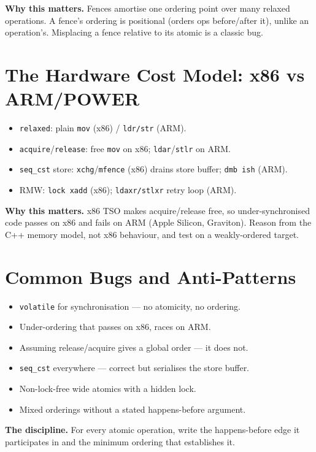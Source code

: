 \textbf{Why this matters.} Fences amortise one ordering point over many relaxed operations. A fence's ordering is positional (orders ops before/after it), unlike an operation's. Misplacing a fence relative to its atomic is a classic bug.

\section{The Hardware Cost Model: x86 vs ARM/POWER}
\begin{itemize}
\item \texttt{relaxed}: plain \texttt{mov} (x86) / \texttt{ldr/str} (ARM).
\item \texttt{acquire}/\texttt{release}: free \texttt{mov} on x86; \texttt{ldar}/\texttt{stlr} on ARM.
\item \texttt{seq\_cst} store: \texttt{xchg}/\texttt{mfence} (x86) drains store buffer; \texttt{dmb ish} (ARM).
\item RMW: \texttt{lock xadd} (x86); \texttt{ldaxr/stlxr} retry loop (ARM).
\end{itemize}

\textbf{Why this matters.} x86 TSO makes acquire/release free, so under-synchronised code passes on x86 and fails on ARM (Apple Silicon, Graviton). Reason from the C++ memory model, not x86 behaviour, and test on a weakly-ordered target.

\section{Common Bugs and Anti-Patterns}
\begin{itemize}
\item \texttt{volatile} for synchronisation --- no atomicity, no ordering.
\item Under-ordering that passes on x86, races on ARM.
\item Assuming release/acquire gives a global order --- it does not.
\item \texttt{seq\_cst} everywhere --- correct but serialises the store buffer.
\item Non-lock-free wide atomics with a hidden lock.
\item Mixed orderings without a stated happens-before argument.
\end{itemize}

\textbf{The discipline.} For every atomic operation, write the happens-before edge it participates in and the minimum ordering that establishes it.
